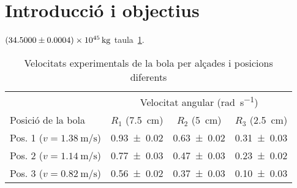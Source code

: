 \section{Introducció i objectius}
$\SI{34.5 \pm 0.0004 e45}{\kg}$ taula~\ref{tab:vel-bola-exp}.

\begin{table}[H]
	\centering
	\begin{tabular}{l c c c}
		\toprule
		\toprule
		& \multicolumn{3}{c}{Velocitat angular (\si{\radian\per\s})} \\
		\cmidrule(l){2-4}
		Posició de la bola & $R_{1}$ (\SI{7.5}{\cm}) & $R_{2}$ (\SI{5}{\cm}) & $R_{3}$ (\SI{2.5}{\cm}) \\
		\midrule
		Pos. 1 ($v = \SI{1.38}{\m\per\s}$) & \num{0.93 \pm 0.02} & \num{0.63 \pm 0.02} & \num{0.31 \pm 0.03} \\
		Pos. 2 ($v = \SI{1.14}{\m\per\s}$) & \num{0.77 \pm 0.03} & \num{0.47 \pm 0.03} & \num{0.23 \pm 0.02} \\
		Pos. 3 ($v = \SI{0.82}{\m\per\s}$) & \num{0.56 \pm 0.02} & \num{0.37 \pm 0.03} & \num{0.10 \pm 0.03} \\
		\bottomrule
	\end{tabular}
	\caption{Velocitats experimentals de la bola per alçades i posicions diferents}
	\label{tab:vel-bola-exp}
\end{table}

